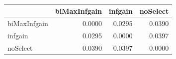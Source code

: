 \begin{tabular}{lrrr}
\toprule
 & biMaxInfgain & infgain & noSelect \\
\midrule
biMaxInfgain & 0.0000 & 0.0295 & 0.0390 \\
infgain & 0.0295 & 0.0000 & 0.0397 \\
noSelect & 0.0390 & 0.0397 & 0.0000 \\
\bottomrule
\end{tabular}
